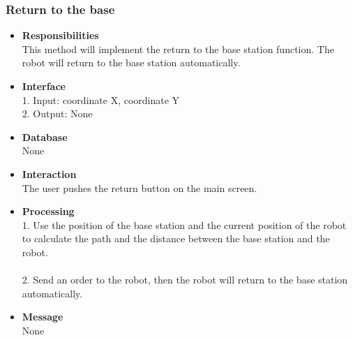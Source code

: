 \documentclass[11pt, a4paper]{article}
\begin{document}
\subsubsection{Return to the base }
\begin{itemize}
\item {\bfseries Responsibilities }\\
This method will implement the return to the base station function. The robot will return to the base station automatically.\\

\item {\bfseries Interface }\\
1. Input: coordinate X, coordinate Y\\
2. Output: None\\

\item {\bfseries Database }\\
None

\item {\bfseries Interaction }\\
The user pushes the return button on the main screen.\\

\item {\bfseries Processing }\\
1. Use the position of the base station and the current position of the robot to calculate the path and the distance between the base station and the robot.\\
\\
2. Send an order to the robot, then the robot will return to the base station automatically.\\

\item {\bfseries Message }\\
None
\end{itemize}

\end{document}
